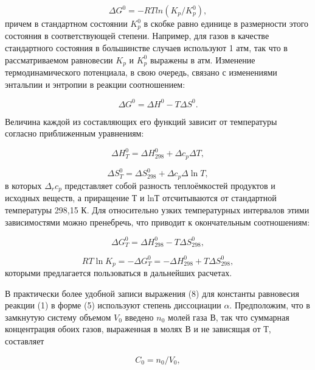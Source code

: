 \documentclass[a4paper,12pt]{article} %
\begin{document}
\begin{equation}
 \Delta G^0 = -RT ln(K_p / K_p^0),
\end{equation}
причем в стандартном состоянии \(K_p^0\) в скобке равно единице в размерности этого состояния в соответствующей степени. Например, для газов в качестве стандартного состояния в большинстве случаев используют 1 атм, так что в рассматриваемом равновесии \(K_p\) и \(K_p^0\) выражены в атм.
Изменение термодинамического потенциала, в свою очередь, связано с изменениями энтальпии и энтропии в реакции соотношением:

\begin{equation}
 \Delta G^0 = \Delta H^0 - T \Delta S^0.
\end{equation}

Величина каждой из составляющих его функций зависит от температуры согласно приближенным уравнениям:

\begin{equation}
 \Delta H_T^0 = \Delta H_{298}^0 + \Delta c_p \Delta T,
\end{equation}

\begin{equation}
 \Delta S_T^0 = \Delta S_{298}^0 + \Delta c_p \Delta \ln{T},
\end{equation}
в которых \(\Delta_rc_p\) представляет собой разность теплоёмкостей продуктов и исходных веществ, а приращение Т и lnТ отсчитываются от стандартной температуры 298,15 К. Для относительно узких температурных интервалов этими зависимостями можно пренебречь, что приводит к окончательным соотношениям:

\begin{equation}
 \Delta G_T^0 = \Delta H_{298}^0 - T \Delta S_{298}^0,
\end{equation}

\begin{equation}
 RT \ln K_p = - \Delta G_T^0 = -\Delta H_{298}^0 + T \Delta S_{298}^0,
\end{equation}
которыми предлагается пользоваться в дальнейших расчетах.
	
В практически более удобной записи выражения (8) для константы равновесия реакции (1) в форме (5) используют степень диссоциации \(\alpha\). Предположим, что в замкнутую систему объемом \(V_0\) введено \(n_0\) молей газа В, так что суммарная концентрация обоих газов, выраженная в молях В и не зависящая от Т, составляет

\begin{equation}
 C_0 = n_0 /V_0,
\end{equation}
\end{document}
